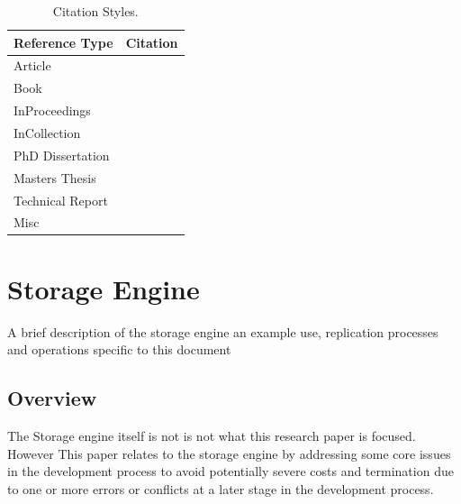 \documentclass[11pt,a4paper,oneside]{book} %
\numberwithin{equation}{section}
\begin{document}
\begin{table}[!th]
\centering


\begin{tabular}{|p{3cm}|p{9cm}|}
\hline
\textbf{Reference Type} & \textbf{Citation}\\ \hline
Article & \cite{Hayes1993}\\ \hline
Book & \cite[p.127-133]{Lamport2005}\\ \hline
InProceedings & \cite*{Nicholls1987}\\ \hline
InCollection & \cite{Lund2019}\\ \hline
PhD Dissertation & \cite{Konnov2019}\\ \hline
Masters Thesis & \cite{Lamport2005}\\ \hline
Technical Report & \cite{Engberg1993}\\ \hline
Misc & \cite{Hayes1993}\\ \hline
\end{tabular}
\caption{Citation Styles.}
\label{t-References}
\end{table}


\chapter{Storage Engine}
A brief description of the storage engine an example use, replication processes and operations specific to this document

\section{Overview}
The Storage engine itself is not is not what this research paper is focused. However This paper relates to the storage engine by addressing some core issues in the development process to avoid potentially severe costs and termination due to one or more errors or conflicts at a later stage in the development process. 
\end{document}
